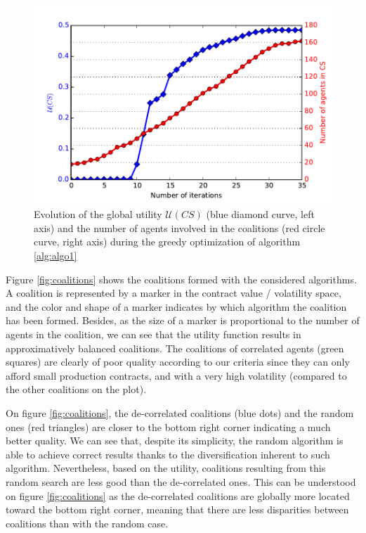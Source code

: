 \documentclass[conference]{IEEEtran}
\begin{document}
\begin{figure}
\includegraphics[scale=.6]{search.pdf}
\caption{Evolution of the global utility $ \mathcal{U}(CS) $ (blue diamond curve, left axis) and the number of agents involved in the coalitions (red circle curve, right axis) during the greedy optimization of algorithm \ref{alg:algo1} }
\label{fig:search}
\end{figure}


Figure \ref{fig:coalitions} shows the coalitions formed with the considered algorithms. A coalition is represented by a marker in the contract value / volatility space, and the color and shape of a marker indicates by which algorithm the coalition has been formed. Besides, as the size of a marker is proportional to the number of agents in the coalition, we can see that the utility function results in approximatively balanced coalitions. The coalitions of correlated agents (green squares) are clearly of poor quality according to our criteria since they can only afford small production contracts, and with a very high volatility (compared to the other coalitions on the plot). 

On figure \ref{fig:coalitions}, the de-correlated coalitions (blue dots) and the random ones (red triangles) are closer to the bottom right corner indicating a much better quality. We can see that, despite its simplicity, the random algorithm is able to achieve correct results thanks to the diversification inherent to such algorithm. Nevertheless, based on the utility, coalitions resulting from this random search are less good than the de-correlated ones. This can be understood on figure \ref{fig:coalitions} as the de-correlated coalitions are globally more located toward the bottom right corner, meaning that there are less disparities between coalitions than with the random case.
\end{document}
